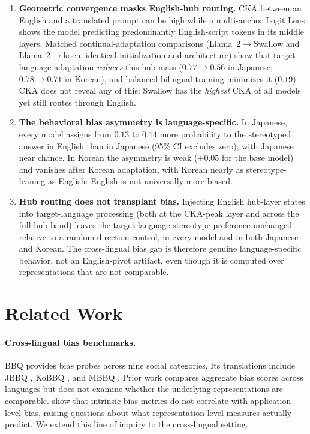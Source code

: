 \documentclass[11pt]{article}
\begin{document}
\begin{enumerate}
\item \textbf{Geometric convergence masks English-hub routing.} CKA between an English and a translated prompt can be high while a multi-anchor Logit Lens shows the model predicting predominantly English-script tokens in its middle layers. Matched continual-adaptation comparisons (Llama~2$\rightarrow$Swallow and Llama~2$\rightarrow$koen, identical initialization and architecture) show that target-language adaptation \textit{reduces} this hub mass ($0.77\rightarrow0.56$ in Japanese; $0.78\to0.71$ in Korean), and balanced bilingual training minimizes it ($0.19$). CKA does not reveal any of this: Swallow has the \textit{highest} CKA of all models yet still routes through English.

\item \textbf{The behavioral bias asymmetry is language-specific.} In Japanese, every model assigns from $0.13$ to $0.14$ more probability to the stereotyped answer in English than in Japanese (95\% CI excludes zero), with Japanese near chance. In Korean the asymmetry is weak ($+0.05$ for the base model) and vanishes after Korean adaptation, with Korean nearly as stereotype-leaning as English: English is not universally more biased.

\item \textbf{Hub routing does not transplant bias.} Injecting English hub-layer states into target-language processing (both at the CKA-peak layer and across the full hub band) leaves the target-language stereotype preference unchanged relative to a random-direction control, in every model and in both Japanese and Korean. The cross-lingual bias gap is therefore genuine language-specific behavior, not an English-pivot artifact, even though it is computed over representations that are not comparable.
\end{enumerate}

\section{Related Work}

\paragraph{Cross-lingual bias benchmarks.}
BBQ \citep{parrish-etal-2022-bbq} provides bias probes across nine social categories. Its translations include JBBQ \citep{yanaka-etal-2025-jbbq}, KoBBQ \citep{jin-etal-2024-kobbq}, and MBBQ \citep{neplenbroek-etal-2024-mbbq}. Prior work compares aggregate bias scores across languages but does not examine whether the underlying representations are comparable. \citet{goldfarb-tarrant-etal-2021-intrinsic} show that intrinsic bias metrics do not correlate with application-level bias, raising questions about what representation-level measures actually predict. We extend this line of inquiry to the cross-lingual setting.
\end{document}
